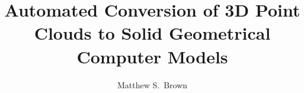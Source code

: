\documentclass[12pt]{drexelthesis}
\title{Automated Conversion of 3D Point Clouds to Solid Geometrical Computer Models}
\author{Matthew S.~Brown}
\begin{document}
\maketitle
\begin{preliminary}

\newpage

\setcounter{page}{2}

\date{} %

\begin{dedication}

\end{dedication}

\begin{acknowledgements}


\end{acknowledgements}


\mytableofcontents\newpage


\setlength{\baselineskip}{0.5\baselineskip}
\listoftables \newpage


\listoffigures \newpage
\setlength{\baselineskip}{2.0\baselineskip}

\begin{abstract}


\end{abstract}
\end{preliminary}
\end{document}
